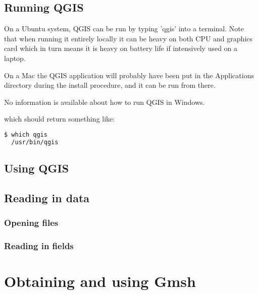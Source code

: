 \subsection{Running QGIS}

On a Ubuntu system, QGIS can be run by typing 'qgis' into a
terminal. Note that when running it entirely locally it can be heavy on both CPU
and graphics card which in turn means it is heavy on battery life if
intensively used on a laptop.

On a Mac the QGIS application will probably have been put in the
Applications directory during the install procedure, and it can be run from
there.

No information is available about how to run QGIS in Windows. 

which should return something like:

\begin{example}
  \begin{lstlisting}[language=bash]
  $ which qgis
  /usr/bin/qgis
\end{lstlisting}
\end{example}

\subsection{Using QGIS}

\subsection{Reading in data}



\subsubsection{Opening files}

\subsubsection{Reading in fields}


\section{Obtaining and using Gmsh}
\label{sect:obtaining_and_using_gmsh}

